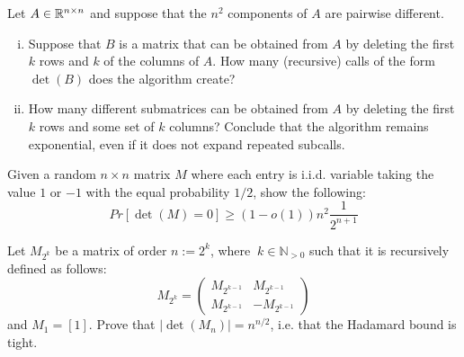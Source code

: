 \documentclass[11pt]{article}
\begin{document}
Let $A \in \mathbb{R}^{n \times n}$  and suppose that the $n^2$ components of $A$ are pairwise different.
\begin{enumerate}[i)]
\item
Suppose that $B$ is a matrix that can be obtained from $A$ by deleting the first $k$ rows and $k$ of the columns of $A$. How many (recursive) calls of the form $\det(B)$ does the algorithm create? 

\item How many different submatrices can be obtained from $A$ by deleting the first $k$ rows and some set of $k$ columns? Conclude that the algorithm remains exponential, even if it does not expand repeated subcalls. 
\end{enumerate}
  
\problem Given a random $n \times n$ matrix $M$ where each entry is i.i.d. variable taking the value $1$ or $-1$ with the equal probability $1/2$, show the following: 
\begin{equation}
Pr\left[\det(M)=0 \right] \geq (1-o(1)) n^2 \frac{1}{2^{n+1}} 
\end{equation}

\problemstar Let $M_{2^k}$ be a matrix of order $n:=2^k$, where $\ k \in \mathbb{N}_{>0}$ such that it is recursively defined as follows:
\begin{equation}
M_{2^k}=
\begin{pmatrix}
    M_{2^{k-1}} & M_{2^{k-1}} \\ 
    M_{2^{k-1}} & -M_{2^{k-1}} 
  \end{pmatrix}
\end{equation}
and $M_1=[1]$. Prove that $|\det(M_{n})|=n^{n/2}$, i.e. that the Hadamard bound is tight.
\end{document}
